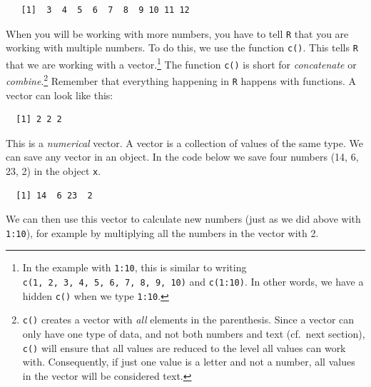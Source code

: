 \documentclass[12pt,oneside]{reedthesis}
\theoremstyle{definition}
\theoremstyle{definition}
\theoremstyle{definition}
\theoremstyle{remark}
\begin{document}
  \begin{verbatim}
   [1]  3  4  5  6  7  8  9 10 11 12
  \end{verbatim}
  When you will be working with more numbers, you have to tell \texttt{R}
  that you are working with multiple numbers. To do this, we use the
  function \texttt{c()}. This tells \texttt{R} that we are working with a
  vector.\footnote{In the example with \texttt{1:10}, this is similar to
    writing \texttt{c(1,\ 2,\ 3,\ 4,\ 5,\ 6,\ 7,\ 8,\ 9,\ 10)} and
    \texttt{c(1:10)}. In other words, we have a hidden \texttt{c()} when
    we type \texttt{1:10}.} The function \texttt{c()} is short for
  \emph{concatenate} or \emph{combine}.\footnote{\texttt{c()} creates a
    vector with \emph{all} elements in the parenthesis. Since a vector can
    only have one type of data, and not both numbers and text (cf.~next
    section), \texttt{c()} will ensure that all values are reduced to the
    level all values can work with. Consequently, if just one value is a
    letter and not a number, all values in the vector will be considered
    text.} Remember that everything happening in \texttt{R} happens with
  functions. A vector can look like this:
  \begin{Shaded}
  \begin{Highlighting}[]
  \NormalTok{(}\NormalTok{, }\NormalTok{, }\NormalTok{)}
  \end{Highlighting}
  \end{Shaded}
  \begin{verbatim}
  [1] 2 2 2
  \end{verbatim}
  This is a \emph{numerical} vector. A vector is a collection of values of
  the same type. We can save any vector in an object. In the code below we
  save four numbers (14, 6, 23, 2) in the object \texttt{x}.
  \begin{Shaded}
  \begin{Highlighting}[]
  \StringTok{ }\NormalTok{(}\NormalTok{, }\NormalTok{, }\NormalTok{, }\NormalTok{)}
  \end{Highlighting}
  \end{Shaded}
  \begin{verbatim}
  [1] 14  6 23  2
  \end{verbatim}
  We can then use this vector to calculate new numbers (just as we did
  above with \texttt{1:10}), for example by multiplying all the numbers in
  the vector with 2.
\end{document}
